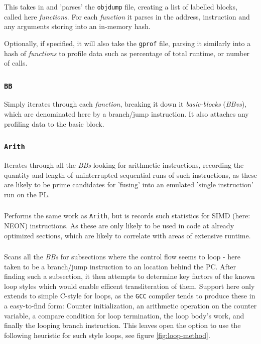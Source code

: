 \documentclass[a4paper]{article}
\begin{document}
This takes in and 'parses' the \texttt{objdump} file, creating a list of labelled blocks, called here \emph{functions}. For each \emph{function} it parses in the address, instruction and any arguments storing into an in-memory hash.

Optionally, if specified, it will also take the \texttt{gprof} file, parsing it similarly into a hash of \emph{functions} to profile data such as percentage of total runtime, or number of calls.

\subsubsection{\texttt{BB}}

Simply iterates through each \emph{function}, breaking it down it \emph{basic-blocks} (\emph{BBvs}), which are denominated here by a branch/jump instruction. It also attaches any profiling data to the basic block.

\subsubsection{\texttt{Arith}}

Iterates through all the \emph{BBs} looking for arithmetic instructions, recording the quantity and length of uninterrupted sequential runs of such instructions, as these are likely to be prime candidates for 'fusing' into an emulated 'single instruction' run on the PL.

\subsubsection{}

Performs the same work as \texttt{Arith}, but is records such statistics for SIMD (here: NEON) instructions. As these are only likely to be used in code at already optimized sections, which are likely to correlate with areas of extensive runtime.

\subsubsection{}

Scans all the \emph{BBs} for subsections where the control flow seems to loop - here taken to be a branch/jump instruction to an location behind the PC. After finding such a subsection, it then attempts to determine key factors of the known loop styles which would enable efficent transliteration of them.
Support here only extends to simple C-style for loops, as the \texttt{GCC} compiler tends to produce these in a easy-to-find form: Counter initialization, an arithmetic operation on the counter variable, a compare condition for loop termination, the loop body's work, and finally the looping branch instruction.
This leaves open the option to use the following heuristic for such style loops, see figure \ref{fig:loop-method}.
\end{document}
